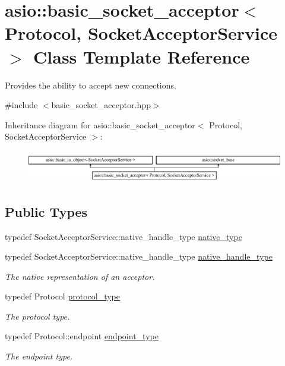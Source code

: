 \hypertarget{classasio_1_1basic__socket__acceptor}{}\section{asio\+:\+:basic\+\_\+socket\+\_\+acceptor$<$ Protocol, Socket\+Acceptor\+Service $>$ Class Template Reference}
\label{classasio_1_1basic__socket__acceptor}


Provides the ability to accept new connections.  




{\ttfamily \#include $<$basic\+\_\+socket\+\_\+acceptor.\+hpp$>$}

Inheritance diagram for asio\+:\+:basic\+\_\+socket\+\_\+acceptor$<$ Protocol, Socket\+Acceptor\+Service $>$\+:\begin{figure}[H]
\begin{center}
\leavevmode
\includegraphics[height=1.424936cm]{classasio_1_1basic__socket__acceptor}
\end{center}
\end{figure}
\subsection*{Public Types}
\begin{DoxyCompactItemize}
\item 
typedef Socket\+Acceptor\+Service\+::native\+\_\+handle\+\_\+type \hyperlink{classasio_1_1basic__socket__acceptor_a816fd87f40cd81374fa6b0c66e11006c}{native\+\_\+type}
\item 
typedef Socket\+Acceptor\+Service\+::native\+\_\+handle\+\_\+type \hyperlink{classasio_1_1basic__socket__acceptor_a6b3afaaad5c55272803ad5b911a00d35}{native\+\_\+handle\+\_\+type}
\begin{DoxyCompactList}\small\item\em The native representation of an acceptor. \end{DoxyCompactList}\item 
typedef Protocol \hyperlink{classasio_1_1basic__socket__acceptor_a38f40022b2596eb88875792bd6c0fb21}{protocol\+\_\+type}
\begin{DoxyCompactList}\small\item\em The protocol type. \end{DoxyCompactList}\item 
typedef Protocol\+::endpoint \hyperlink{classasio_1_1basic__socket__acceptor_a393d69e2f8a370aaa13a9018af4c0048}{endpoint\+\_\+type}
\begin{DoxyCompactList}\small\item\em The endpoint type. \end{DoxyCompactList}\end{DoxyCompactItemize}
